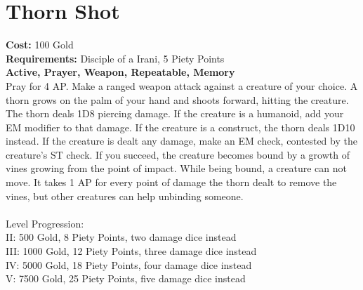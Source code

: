 \section*{Thorn Shot}
\textbf{Cost:} 100 Gold\\
\textbf{Requirements:} Disciple of a Irani, 5 Piety Points \\
\textbf{Active, Prayer, Weapon, Repeatable, Memory}\\
Pray for 4 AP. Make a ranged weapon attack against a creature of your choice. A thorn grows on the palm of your hand and shoots forward, hitting the creature. The thorn deals 1D8 piercing damage. If the creature is a humanoid, add your EM modifier to that damage. If the creature is a construct, the thorn deals 1D10 instead. If the creature is dealt any damage, make an EM check, contested by the creature's ST check. If you succeed, the creature becomes bound by a growth of vines growing from the point of impact. While being bound, a creature can not move. It takes 1 AP for every point of damage the thorn dealt to remove the vines, but other creatures can help unbinding someone.\\
\\
Level Progression:\\
II: 500 Gold, 8 Piety Points, two damage dice instead\\
III: 1000 Gold, 12 Piety Points, three damage dice instead\\
IV: 5000 Gold, 18 Piety Points, four damage dice instead\\
V: 7500 Gold, 25 Piety Points, five damage dice instead\\